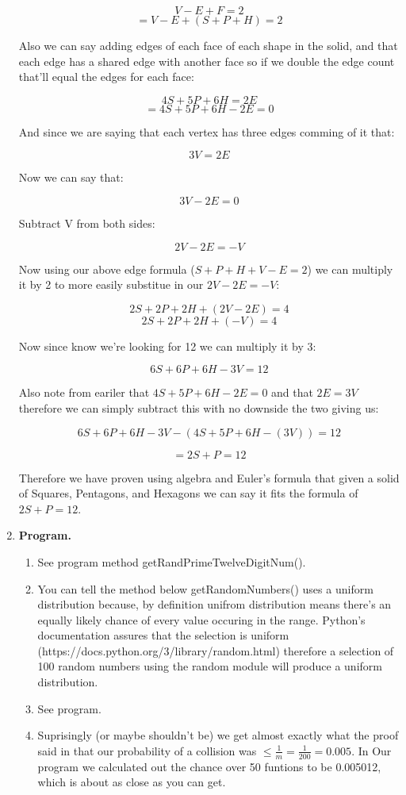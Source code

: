 \documentclass{article}
\begin{document}
\begin{enumerate}
    \[V - E + F = 2\]
    \[= V - E + (S + P + H) = 2\]

    Also we can say adding edges of each face of each shape in the solid, and that each edge has a shared edge with another face so if we double the edge count that'll equal the edges for each face:

    \[4S + 5P + 6H = 2E\]
    \[= 4S + 5P + 6H - 2E = 0\]
    
    And since we are saying that each vertex has three edges comming of it that:

    \[3V = 2E\]

    Now we can say that:

    \[3V - 2E = 0\]

    Subtract V from both sides:

    \[2V - 2E = -V\]

    Now using our above edge formula ($S + P + H + V - E = 2$) we can multiply it by 2 to more easily substitue in our $2V - 2E = -V$:

    \[2S + 2P + 2H + (2V - 2E) = 4\]
    \[2S + 2P + 2H + (-V) = 4\]

    Now since know we're looking for 12 we can multiply it by 3:

    \[6S + 6P + 6H - 3V = 12\]

    Also note from eariler that $4S + 5P + 6H - 2E = 0$ and that $2E = 3V$ therefore we can simply subtract this with no downside the two giving us:

    \[6S + 6P + 6H - 3V - (4S + 5P + 6H - (3V)) = 12\]

    \[= 2S + P = 12\]

    Therefore we have proven using algebra and Euler's formula that given a solid of Squares, Pentagons, and Hexagons we can say it fits the formula of $2S + P = 12$.

    \item \textbf{Program.}
    \begin{enumerate}
      \item See program method getRandPrimeTwelveDigitNum().
      \item You can tell the method below getRandomNumbers() uses a uniform distribution because, by definition unifrom distribution means there's an equally likely chance of every value occuring in the range. 
      Python's documentation assures that the selection is uniform (https://docs.python.org/3/library/random.html) therefore a selection of 100 random numbers using the random module will produce a uniform distribution.
      \item See program.
      \item Suprisingly (or maybe shouldn't be) we get almost exactly what the proof said in that our probability of a collision was $\leq \frac{1}{m} = \frac{1}{200} = 0.005$. 
      In Our program we calculated out the chance over 50 funtions to be 0.005012, which is about as close as you can get.      
    \end{enumerate}


\end{enumerate}
\end{document}
